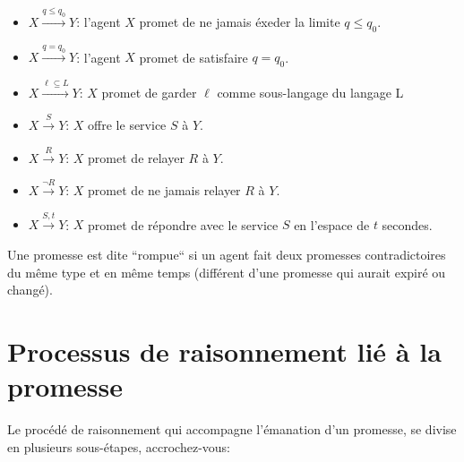\begin{itemize}
    \item $X \xrightarrow{q \leq q_0} Y $: l'agent $X$ promet de ne jamais éxeder la
        limite $q \leq q_0$.
    \item $X \xrightarrow{q = q_0} Y $: l'agent $X$ promet de satisfaire
        $q = q_0$.
    \item $X \xrightarrow{\ell \subseteq  L} Y $: $X$ promet de garder $\ell$
        comme sous-langage du langage L
    \item $X \xrightarrow{S} Y $: $X$ offre le service $S$ à $Y$.
    \item $X \xrightarrow{R} Y $: $X$ promet de relayer $R$ à $Y$.
    \item $X \xrightarrow{\neg R} Y $: $X$ promet de ne jamais relayer $R$ à $Y$.
    \item $X \xrightarrow{S,t} Y $: $X$ promet de répondre avec le service $S$
        en l'espace de $t$ secondes.
\end{itemize}

Une promesse est dite ``rompue`` si un agent fait deux promesses contradictoires du
même type et en même temps (différent d'une promesse qui aurait expiré ou changé).

\section{Processus de raisonnement lié à la promesse}

Le procédé de raisonnement qui accompagne l'émanation d'un promesse, se divise
en plusieurs sous-étapes, accrochez-vous:

